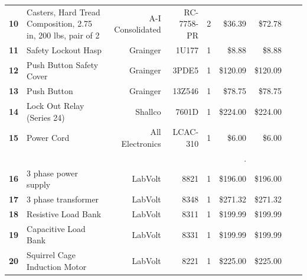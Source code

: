 \begin{table}[!htp]
{\begin{tabular}{llrrrrrrr}
			\textbf{10}    & Casters, Hard Tread Composition, 2.75 in, 200 lbs, pair of 2                     & A-I Consolidated  & RC-7758-PR        & 2        & \$36.39  & \$72.78        \\
			\textbf{11}    & Safety Lockout Hasp                                                              & Grainger          & 1U177             & 1        & \$8.88   & \$8.88         \\
			\textbf{12}    & Push Button Safety Cover                                                         & Grainger          & 3PDE5             & 1        & \$120.09 & \$120.09       \\
			\textbf{13}    & Push Button                                                                      & Grainger          & 13Z546            & 1        & \$78.75  & \$78.75        \\
			\textbf{14}    & Lock Out Relay (Series 24)                                                       & Shallco           & 7601D             & 1        & \$224.00 & \$224.00       \\
			\textbf{15}    & Power Cord                                                                       & All Electronics   & LCAC-310          & 1        & \$6.00   & \$6.00         \\
			\textbf{}      &                                                                                  &                   &                   &          & .        &                \\
			\textbf{16}    & 3 phase power supply                                                             & LabVolt           & 8821              & 1        & \$196.00 & \$196.00       \\
			\textbf{17}    & 3 phase transformer                                                              & LabVolt           & 8348              & 1        & \$271.32 & \$271.32       \\
			\textbf{18}    & Resistive Load Bank                                                              & LabVolt           & 8311              & 1        & \$199.99 & \$199.99       \\
			\textbf{19}    & Capacitive Load Bank                                                             & LabVolt           & 8331              & 1        & \$199.99 & \$199.99       \\
			\textbf{20}    & Squirrel Cage Induction Motor                                                    & LabVolt           & 8221              & 1        & \$225.00 & \$225.00       \\

\end{tabular}}
\end{table}
